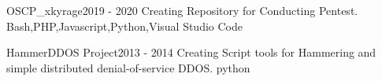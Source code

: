 %
%
%


\begin{projects}
	\project
	{OSCP_xkyrage}{2019 - 2020}
	{  }
	{Creating Repository for Conducting Pentest.}
	{Bash,PHP,Javascript,Python,Visual Studio Code}
				
	\project
	{HammerDDOS Project}{2013 - 2014}
	{ }
	{Creating Script tools for Hammering and simple distributed denial-of-service {DDOS}. }
	{python}

\end{projects}